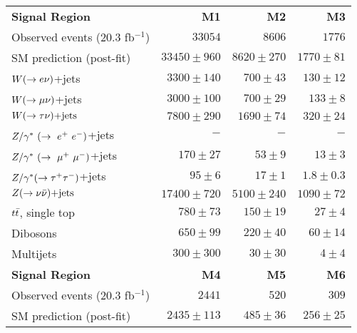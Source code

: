 \begin{table}[!ht]
\begin{center}
\begin{small}
\begin{tabular*}{\textwidth}{@{\extracolsep{\fill}}lrrr}\hline
{\bf  Signal Region}  & \textbf{M1} & \textbf{M2} & \textbf{M3}  \\
    Observed events  (20.3 fb${}^{-1}$)&  $33054$  & $8606$  & $1776$   \\ \hline

    SM prediction (post-fit) &  $33450 \pm 960$  & $8620 \pm 270$ & $1770 \pm 81$  \\ \hline

    $W(\rightarrow e \nu)$+jets        &  $3300 \pm 140$ &  $700 \pm 43$   & $130 \pm 12$  \\

    $W(\rightarrow \mu \nu)$+jets        &  $3000 \pm 100$ &  $700 \pm 29$  & $133 \pm 8$   \\

    $W(\rightarrow \tau \nu)\text{+jets}$        &  $7800 \pm 290$  & $1690 \pm 74$   & $320 \pm 24$  \\

    $Z/\gamma^*~(\rightarrow~e^+~e^-)$+jets        &  $-$   &  $-$ & $-$  \\

    $Z/\gamma^*~(\rightarrow~\mu^+~\mu^-)$+jets        &  $170 \pm 27$  & $53 \pm 9$  & $13 \pm 3$  \\

    $Z/\gamma^*(\rightarrow \tau^+ \tau^-)$+jets        &  $95 \pm 6$    & $17 \pm 1$ & $1.8 \pm 0.3$ \\

    $Z(\rightarrow \nu \bar{\nu})\text{+jets}$        &  $17400 \pm 720$ & $5100 \pm 240$  &$1090 \pm 72$  \\ 

    $t\bar{t}$, single top          &     $780 \pm 73$   &  $150 \pm 19$ & $27 \pm 4$ \\

    Dibosons      &  $650 \pm 99$  & $220 \pm 40$  &  $60 \pm 14$  \\

    Multijets     &  $300 \pm 300$  & $30 \pm 30$  &  $4 \pm 4$  \\ \hline \hline

{\bf  Signal Region}  & \textbf{M4} & \textbf{M5} & \textbf{M6}  \\
    Observed events  (20.3 fb${}^{-1}$)&  $2441$ & $520$ & $309$ \\ \hline

    SM prediction (post-fit) &  $2435 \pm 113$ & $485 \pm 36$       & $256 \pm 25$ \\ \hline


\end{tabular*}
\end{small}
\end{center}
\end{table}

